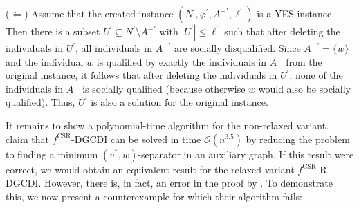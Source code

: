 \documentclass[
    12pt,               %
    a4paper,            %
    bibtotoc,           %
    pointlessnumbers,   %
    ngerman,            %
    titlepage,          %
    leqno,              %
    ]{scrarticle}       %
\begin{document}
\begin{Proof}
($\Leftarrow$) Assume that the created instance $(N^\prime, \varphi^\prime, {A^-}^\prime, \ell^\prime)$ is a YES-instance. Then there is a subset $U^\prime \subseteq N^\prime \setminus {A^-}^\prime$ with $|U^\prime| \leq \ell^\prime$ such that after deleting the individuals in $U^\prime$, all individuals in ${A^-}^\prime$ are socially disqualified. Since ${A^-}^\prime = \{w\}$ and the individual $w$ is qualified by exactly the individuals in $A^-$ from the original instance, it follows that after deleting the individuals in $U^\prime$, none of the individuals in $A^-$ is socially qualified (because otherwise $w$ would also be socially qualified). Thus, $U^\prime$ is also a solution for the original instance.
\end{Proof}



It remains to show a polynomial-time algorithm for the non-relaxed variant. \textcite[Theorem 7]{ERY20} claim that $f^{\text{CSR}}$-DGCDI can be solved in time $\mathcal{O}(n^{3.5})$ by reducing the problem to finding a minimum $(v^\ast, w)$-separator in an auxiliary graph. If this result were correct, we would obtain an equivalent result for the relaxed variant $f^{\text{CSR}}$-R-DGCDI. However, there is, in fact, an error in the proof by \textcite{ERY20}. To demonstrate this, we now present a counterexample for which their algorithm fails:



\clearpage
\end{document}
